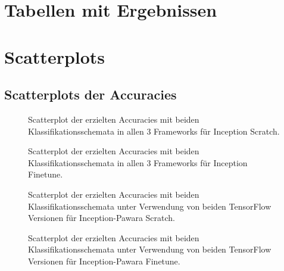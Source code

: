 \makeatletter
\let\savedchap\@makechapterhead
\def\@makechapterhead{\vspace*{-2cm}\savedchap}
\makeatletter


\chapter{Tabellen mit Ergebnissen}
\label{ch:Anhang_Tabellen}


\restoregeometry %
\let\@makechapterhead\savedchap %

\chapter{Scatterplots}
\label{ch:Anhang_Scatterplots}

\section{Scatterplots der Accuracies}
\label{ch:Anhang_ScatterplotsAccuracies}
\begin{figure}[H]
\begin{adjustbox}{width=\textwidth, center}

\end{adjustbox}
\caption{Scatterplot der erzielten Accuracies mit beiden Klassifikationsschemata in allen 3 Frameworks für Inception Scratch.}
\label{fig:ScatterplotIS}
\end{figure}
\begin{figure}[H]
\begin{adjustbox}{width=\textwidth, center}

\end{adjustbox}
\caption{Scatterplot der erzielten Accuracies mit beiden Klassifikationsschemata in allen 3 Frameworks für Inception Finetune.}
\label{fig:ScatterplotIF}
\end{figure}
\begin{figure}[H]
\begin{adjustbox}{width=\textwidth, center}

\end{adjustbox}
\caption{Scatterplot der erzielten Accuracies mit beiden Klassifikationsschemata unter Verwendung von beiden TensorFlow \cite{tensorflow} Versionen für Inception-Pawara Scratch.}
\label{fig:ScatterplotIPS}
\end{figure}
\begin{figure}[H]
\begin{adjustbox}{width=\textwidth, center}

\end{adjustbox}
\caption{Scatterplot der erzielten Accuracies mit beiden Klassifikationsschemata unter Verwendung von beiden TensorFlow \cite{tensorflow} Versionen für Inception-Pawara Finetune.}
\label{fig:ScatterplotIPF}
\end{figure}


